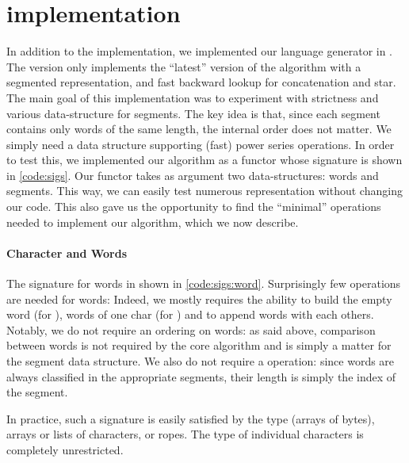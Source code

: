 \section{\ocaml implementation}
\label{sec:ocaml}

\lstset{language=[Objective]Caml}

In addition to the \haskell implementation, we implemented our language generator
in \ocaml.
The \ocaml version only implements the ``latest'' version of the
algorithm with a segmented representation, and fast backward lookup for concatenation and star.
The main goal of this implementation was to experiment with strictness
and various data-structure for segments. 
The key idea is that, since each segment contains only words of the same length,
the internal order does not matter. We simply need a data structure
supporting (fast) power series operations.
In order to test this, we implemented our algorithm as a functor whose signature
is shown in \autoref{code:sigs}.
Our functor takes as argument two data-structures: words and segments.
This way, we can easily test numerous representation without changing
our code. This also gave us the opportunity to find the ``minimal'' operations
needed to implement our algorithm, which we now describe.

\paragraph{Character and Words}

The signature for words in shown in \autoref{code:sigs:word}.
Surprisingly few operations are needed for words: Indeed, we mostly requires the ability to build the empty word (for ),
words of one char (for ) and to append words
with each others.
Notably, we do not require an ordering on words: as said above, comparison between words is not required by the core algorithm and is simply a matter for the segment
data structure.
We also do not require a  operation: since words are always
classified in the appropriate segments, their length is simply the index
of the segment.

In practice, such a signature is easily satisfied by the \ocaml {}
type (\ie arrays of bytes), arrays or lists of characters, or ropes. The
type of individual characters is completely unrestricted.

